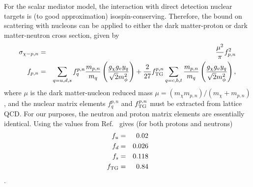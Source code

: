 For the scalar mediator model, the interaction with direct detection nuclear targets is (to good approximation) isospin-conserving. Therefore, the bound on scattering with nucleons can be applied to either the dark matter-proton or dark matter-neutron cross section, given by
\begin{eqnarray}
\sigma_{\chi-p,n} & = & \frac{\mu^2}{\pi} f_{p,n}^2 \\
f_{p,n} & = & \sum_{q=u,d,s} f^{p,n}_q \frac{m_{p,n}}{m_q} \left(\frac{g_\chi g_v y_q}{\sqrt{2}m_\phi^2} \right) + \frac{2}{27} f_{\rm TG}^{p,n} \sum_{q=c,b,t} \frac{m_{p,n}}{m_q} \left(\frac{g_\chi g_v y_q}{\sqrt{2}m_\phi^2} \right),
\end{eqnarray}
where $\mu$ is the dark matter-nucleon reduced mass $\mu = (m_\chi m_{p,n})/(m_\chi + m_{p,n})$, and the nuclear matrix elements $f_{q}^{p,n}$ and $f_{\rm TG}^{p,n}$ must be extracted from lattice QCD. For our purposes, the neutron and proton matrix elements are essentially identical. Using the values from Ref.~\cite{Fitzpatrick:2010em} gives (for both protons and neutrons)
\begin{eqnarray}
f_u & = & 0.02 \\
f_d & = & 0.026 \\
f_s & = & 0.118 \\
f_{\rm TG} & = & 0.84
\end{eqnarray}.

